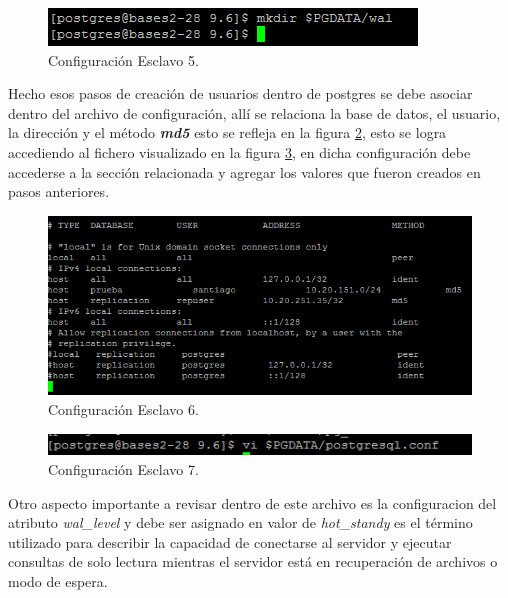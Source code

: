 \begin{figure}[H]
\centering
\includegraphics[width=\columnwidth]{eRelatedWorks/src/Captura5}
\caption{Configuración Esclavo 5. }\label{figC:5}
\end{figure}

Hecho esos pasos de creación de usuarios dentro de postgres se debe asociar dentro del archivo de configuración, allí se relaciona la base de datos, el usuario, la dirección y el método \textbf{\textit{md5}} esto se refleja en la figura \ref{figC:6}, esto se logra accediendo al fichero visualizado en la figura \ref{figC:7}, en dicha configuración debe accederse a la sección relacionada y agregar los valores que fueron creados en pasos anteriores.

\begin{figure}[H]
\centering
\includegraphics[width=\columnwidth]{eRelatedWorks/src/Captura6}
\caption{Configuración Esclavo 6. }\label{figC:6}
\end{figure}

\begin{figure}[H]
\centering
\includegraphics[width=\columnwidth]{eRelatedWorks/src/Captura7}
\caption{Configuración Esclavo 7. }\label{figC:7}
\end{figure}

Otro aspecto importante a revisar dentro de este archivo es la configuracion del atributo \textit{wal\_level} y debe ser asignado en valor de \textit{hot\_standy} es el término utilizado para describir la capacidad de conectarse al servidor y ejecutar consultas de solo lectura mientras el servidor está en recuperación de archivos o modo de espera. 

